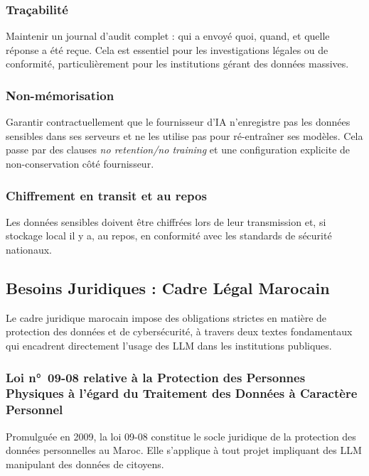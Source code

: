 \documentclass[12pt, a4paper]{report}
\begin{document}
\subsubsection{Traçabilité}

Maintenir un journal d'audit complet : qui a envoyé quoi, quand, et
quelle réponse a été reçue. Cela est essentiel pour les investigations
légales ou de conformité, particulièrement pour les institutions gérant
des données massives.

\subsubsection{Non-mémorisation}

Garantir contractuellement que le fournisseur d'IA n'enregistre pas les
données sensibles dans ses serveurs et ne les utilise pas pour
ré-entraîner ses modèles. Cela passe par des clauses
\textit{no retention/no training} et une configuration explicite de
non-conservation côté fournisseur.

\subsubsection{Chiffrement en transit et au repos}

Les données sensibles doivent être chiffrées lors de leur transmission
et, si stockage local il y a, au repos, en conformité avec les standards
de sécurité nationaux.

\subsection{Besoins Juridiques : Cadre Légal Marocain}

Le cadre juridique marocain impose des obligations strictes en matière de
protection des données et de cybersécurité, à travers deux textes
fondamentaux qui encadrent directement l'usage des LLM dans les
institutions publiques.

\subsubsection{Loi n°~09-08 relative à la Protection des Personnes
Physiques à l'égard du Traitement des Données à Caractère Personnel}

Promulguée en 2009, la loi 09-08 constitue le socle juridique de la
protection des données personnelles au Maroc. Elle s'applique à tout
projet impliquant des LLM manipulant des données de citoyens.
\end{document}
